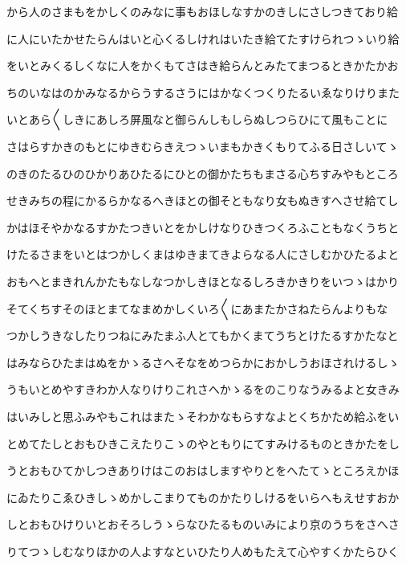 \documentclass[a4paper,11pt,landscape]{ltjtarticle}
\begin{document}
から人のさまもをかしくのみなに事もおほしなすかのきしにさしつきており給
\par\medskip
に人にいたかせたらんはいと心くるしけれはいたき給てたすけられつゝいり給
\par\medskip
をいとみくるしくなに人をかくもてさはき給らんとみたてまつるときかたかお
\par\medskip
ちのいなはのかみなるからうするさうにはかなくつくりたるいゑなりけりまた
\par\medskip
いとあら〱しきにあしろ屏風なと御らんしもしらぬしつらひにて風もことに
\par\medskip
さはらすかきのもとにゆきむらきえつゝいまもかきくもりてふる日さしいてゝ
\par\medskip
のきのたるひのひかりあひたるにひとの御かたちもまさる心ちすみやもところ
\par\medskip
せきみちの程にかるらかなるへきほとの御そともなり女もぬきすへさせ給てし
\par\medskip
かはほそやかなるすかたつきいとをかしけなりひきつくろふこともなくうちと
\par\medskip
けたるさまをいとはつかしくまはゆきまてきよらなる人にさしむかひたるよと
\par\medskip
おもへとまきれんかたもなしなつかしきほとなるしろきかきりをいつゝはかり
\par\medskip
そてくちすそのほとまてなまめかしくいろ〱にあまたかさねたらんよりもな
\par\medskip
つかしうきなしたりつねにみたまふ人とてもかくまてうちとけたるすかたなと
\par\medskip
はみならひたまはぬをかゝるさへそなをめつらかにおかしうおほされけるしゝ
\par\medskip
うもいとめやすきわか人なりけりこれさへかゝるをのこりなうみるよと女きみ
\par\medskip
はいみしと思ふみやもこれはまたゝそわかなもらすなよとくちかため給ふをい
\par\medskip
とめてたしとおもひきこえたりこゝのやともりにてすみけるものときかたをし
\par\medskip
うとおもひてかしつきありけはこのおはしますやりとをへたてゝところえかほ
\par\medskip
にゐたりこゑひきしゝめかしこまりてものかたりしけるをいらへもえせすおか
\par\medskip
しとおもひけりいとおそろしうゝらなひたるものいみにより京のうちをさへさ
\par\medskip
りてつゝしむなりほかの人よすなといひたり人めもたえて心やすくかたらひく
\par\medskip
\end{document}

